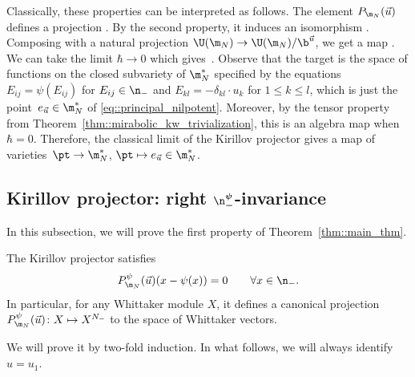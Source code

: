	\begin{Remark}
		\label{rmk::kirillov_proj_classical}
		Classically, these properties can be interpreted as follows. The element $P_{\m_N}(\vec{u})$ defines a projection
.
		By the second property, it induces an isomorphism
.
		Composing with a natural projection $\U(\m_N) \rightarrow \U(\m_N)/\b^{\vec{u}}$, we get a map
.
		We can take the limit $\hbar \rightarrow 0$ which gives~.
		Observe that the target is the space of functions on the closed subvariety of $\m_N^*$ specified by the equations $E_{ij} = \psi(E_{ij})$ for $E_{ij}\in \n_-$ and ${E_{kl} = -\delta_{kl}\cdot u_k}$ for $1 \leq k \leq l$, which is just the point~${e_{\vec{u}}\in \m_N^*}$ of \eqref{eq::principal_nilpotent}. Moreover, by the tensor property from Theorem~\ref{thm::mirabolic_kw_trivialization}, this is an algebra map when $\hbar=0$. Therefore, the classical limit of the Kirillov projector gives a map of varieties~${
		\pt \rightarrow \m_N^*}$, $ \pt \mapsto e_{\vec{u}} \in \m_N^*$.
	\end{Remark}
	
	\subsection[Kirillov projector: right n-invariance]{Kirillov projector: right $\boldsymbol{\n_-^{\psi}}$-invariance}
	\label{subsect::proj_right_inv}
	
	In this subsection, we will prove the first property of Theorem~\ref{thm::main_thm}.
	
	\begin{Theorem}
		\label{thm::proj_n_inv}
		The Kirillov projector satisfies
		\[
		P_{\m_N}^{\psi}(\vec{u}) (x - \psi(x)) = 0\qquad \forall x\in \n_-.
		\]
		In particular, for any Whittaker module $X$, it defines a canonical projection
$
		P_{\m_N}^{\psi}(\vec{u}) \colon X \mapsto X^{N_-}
$
		to the space of Whittaker vectors.
	\end{Theorem}
	
	We will prove it by two-fold induction. In what follows, we will always identify $u = u_1$.
	
